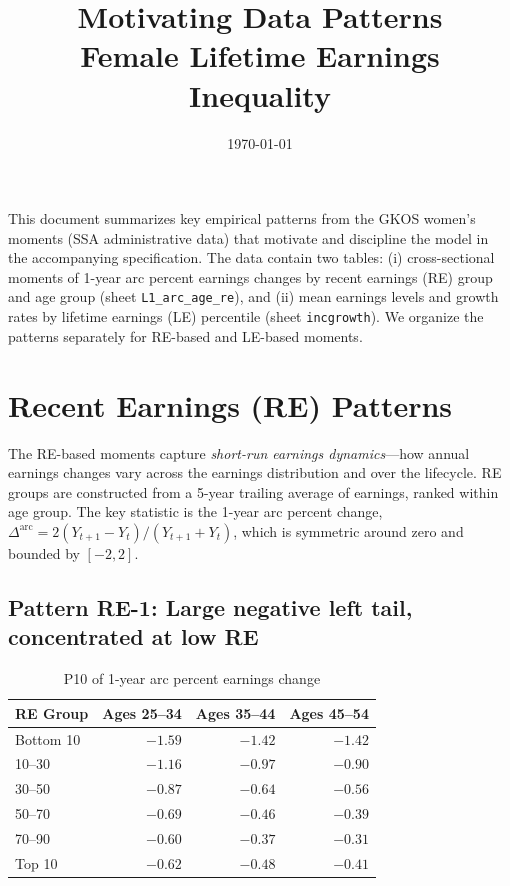 \documentclass[11pt]{article}
\title{\textbf{Motivating Data Patterns} \\ Female Lifetime Earnings Inequality}
\author{}
\date{\today}
\begin{document}
\maketitle

\noindent This document summarizes key empirical patterns from the GKOS women's moments (SSA administrative data) that motivate and discipline the model in the accompanying specification. The data contain two tables: (i) cross-sectional moments of 1-year arc percent earnings changes by recent earnings (RE) group and age group (sheet \texttt{L1\_arc\_age\_re}), and (ii) mean earnings levels and growth rates by lifetime earnings (LE) percentile (sheet \texttt{incgrowth}). We organize the patterns separately for RE-based and LE-based moments.

\section{Recent Earnings (RE) Patterns}

The RE-based moments capture \emph{short-run earnings dynamics}---how annual earnings changes vary across the earnings distribution and over the lifecycle. RE groups are constructed from a 5-year trailing average of earnings, ranked within age group. The key statistic is the 1-year arc percent change, $\Delta^{\text{arc}} = 2(Y_{t+1} - Y_t)/(Y_{t+1} + Y_t)$, which is symmetric around zero and bounded by $[-2, 2]$.

\subsection{Pattern RE-1: Large negative left tail, concentrated at low RE}

\begin{table}[h]\centering
\caption{P10 of 1-year arc percent earnings change}
\begin{tabular}{lrrr}
\toprule
RE Group & Ages 25--34 & Ages 35--44 & Ages 45--54 \\
\midrule
Bottom 10 & $-1.59$ & $-1.42$ & $-1.42$ \\
10--30    & $-1.16$ & $-0.97$ & $-0.90$ \\
30--50    & $-0.87$ & $-0.64$ & $-0.56$ \\
50--70    & $-0.69$ & $-0.46$ & $-0.39$ \\
70--90    & $-0.60$ & $-0.37$ & $-0.31$ \\
Top 10    & $-0.62$ & $-0.48$ & $-0.41$ \\
\bottomrule
\end{tabular}
\end{table}
\end{document}
